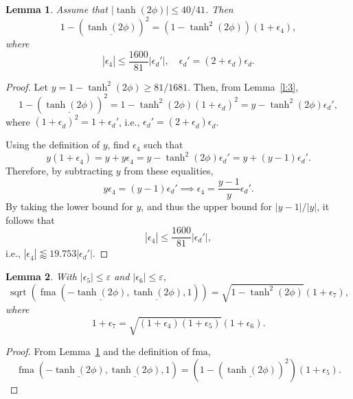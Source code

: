 \documentclass[a4paper,12pt,twoside]{article}
\newtheorem{lem}{Lemma}
\begin{document}
\begin{lem}\label{l:4}
  Assume that $|\tanh(2\phi)|\le 40/41$.  Then
  \begin{displaymath}
    1-(\underline{\tanh(2\phi)})^2=(1-\tanh^2(2\phi))(1+\epsilon_4),
  \end{displaymath}
  where
  \begin{displaymath}
    |\epsilon_4^{}|\le\frac{1600}{81}|\epsilon_d'|,\quad\epsilon_d'=(2+\epsilon_d^{})\epsilon_d^{}.
  \end{displaymath}
\end{lem}
\begin{proof}
  Let $y=1-\tanh^2(2\phi)\ge 81/1681$.  Then, from Lemma~\ref{l:3},
  \begin{displaymath}
    1-(\underline{\tanh(2\phi)})^2=1-\tanh^2(2\phi)(1+\epsilon_d^{})^2=y-\tanh^2(2\phi)\epsilon_d',
  \end{displaymath}
  where $(1+\epsilon_d^{})^2=1+\epsilon_d'$, i.e.,
  $\epsilon_d'=(2+\epsilon_d^{})\epsilon_d^{}$.

  Using the definition of $y$, find $\epsilon_4$ such that
  \begin{displaymath}
    y(1+\epsilon_4^{})=y+y\epsilon_4^{}=y-\tanh^2(2\phi)\epsilon_d'=y+(y-1)\epsilon_d'.
  \end{displaymath}
  Therefore, by subtracting $y$ from these equalities,
  \begin{displaymath}
    y\epsilon_4^{}=(y-1)\epsilon_d'\implies\epsilon_4^{}=\frac{y-1}{y}\epsilon_d'.
  \end{displaymath}
  By taking the lower bound for $y$, and thus the upper bound for
  $|y-1|/|y|$, it follows that
  \begin{displaymath}
    |\epsilon_4^{}|\le\frac{1600}{81}|\epsilon_d'|,
  \end{displaymath}
  i.e., $|\epsilon_4^{}|\lessapprox 19.753|\epsilon_d'|$.
\end{proof}

\begin{lem}\label{l:5}
  With $|\epsilon_5|\le\varepsilon$ and $|\epsilon_6|\le\varepsilon$,
  \begin{displaymath}
    \mathop{\mathrm{sqrt}}(\mathop{\mathrm{fma}}(-\underline{\tanh(2\phi)},\underline{\tanh(2\phi)},1))=\sqrt{1-\tanh^2(2\phi)}(1+\epsilon_7),
  \end{displaymath}
  where
  \begin{displaymath}
    1+\epsilon_7=\sqrt{(1+\epsilon_4)(1+\epsilon_5)}(1+\epsilon_6).
  \end{displaymath}
\end{lem}
\begin{proof}
  From Lemma~\ref{l:4} and the definition of $\mathrm{fma}$,
  \begin{displaymath}
    \mathop{\mathrm{fma}}(-\underline{\tanh(2\phi)},\underline{\tanh(2\phi)},1)=(1-(\underline{\tanh(2\phi)})^2)(1+\epsilon_5).
  \end{displaymath}
\end{proof}
\end{document}
